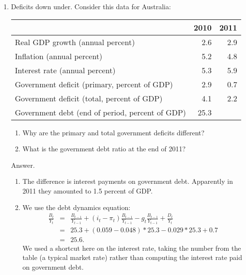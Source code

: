 \begin{enumerate}
\item Deficits down under.
Consider this data for Australia:
%
\begin{center}
\begin{tabular}{lrr}
\toprule
        & 2010 & 2011 \\
\midrule
Real GDP growth (annual percent) & 2.6 & 2.9 \\
Inflation  (annual percent)      & 5.2 & 4.8 \\
Interest rate  (annual percent)  & 5.3 & 5.9 \\
Government deficit (primary, percent of GDP)    & 2.9 & 0.7 \\
Government deficit (total, percent of GDP)      & 4.1 & 2.2 \\
Government debt (end of period, percent of GDP) & 25.3 \\
\bottomrule
\end{tabular}
\end{center}
\begin{enumerate}
\item Why are the primary and total government deficits different?
\item What is the government debt ratio at the end of 2011?
\end{enumerate}

Answer.
\begin{enumerate}
\item The difference is interest payments on government debt.
Apparently in 2011 they amounted to 1.5 percent of GDP.
\item We use the debt dynamics equation:
\begin{eqnarray*}
    \frac{B_{t}}{Y_t}
            &=&
                \frac{B_{t-1}}{Y_{t-1}} + (i_t-\pi_t) \frac{B_{t-1}}{Y_{t-1}}
                - g_t \frac{B_{t-1}}{Y_{t-1}}
                +  \frac{D_{t}}{Y_{t}}  \\
             &=& 25.3 + (0.059-0.048)*25.3 - 0.029*25.3 + 0.7 \\
             &=&  25.6 .
\end{eqnarray*}
We used a shortcut here on the interest rate, taking the number
from the table (a typical market rate) rather than computing
the interest rate paid on government debt.
\end{enumerate}



\end{enumerate}
